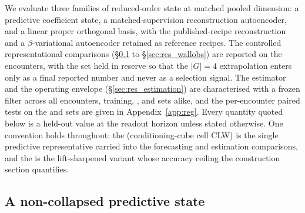 
We evaluate three families of reduced-order state at matched pooled dimension: a predictive coefficient state, a matched-supervision reconstruction autoencoder, and a linear proper orthogonal basis, with the published-recipe reconstruction and a $\beta$-variational autoencoder retained as reference recipes. The controlled representational comparisons (\S\ref{sec:res_construct} to \S\ref{sec:res_wallobs}) are reported on the \TestSplit{} encounters, with the \BoundarySplit{} set held in reserve so that the $|G| = 4$ extrapolation enters only as a final reported number and never as a selection signal. The estimator and the operating envelope (\S\ref{sec:res_estimation}) are characterised with a frozen filter across all encounters, training, \ValSplit{}, \TestSplit{} and \BoundarySplit{} sets alike, and the per-encounter paired tests on the \TestSplit{} and \BoundarySplit{} sets are given in Appendix~\ref{app:reg}. Every quantity quoted below is a held-out value at the readout horizon unless stated otherwise. One convention holds throughout: the \PredState{} (conditioning-cube cell CLW) is the single predictive representative carried into the forecasting and estimation comparisons, and the \LiftState{} is the lift-sharpened variant whose accuracy ceiling the construction section quantifies.\re

\subsection{A non-collapsed predictive state}
\label{sec:res_construct}

